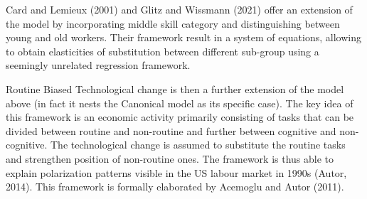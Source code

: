\documentclass{article}
\begin{document}
Card and Lemieux (2001) and Glitz and Wissmann (2021) offer an extension of the model by incorporating middle skill category and distinguishing between young and old workers. Their framework result in a system of equations, allowing to obtain elasticities of substitution between different sub-group using a seemingly unrelated regression framework.

Routine Biased Technological change is then a further extension of the model above (in fact it nests the Canonical model as its specific case). The key idea of this framework is an economic activity primarily consisting of tasks that can be divided between routine and non-routine and further between cognitive and non-cognitive. The technological change is assumed to substitute the routine tasks and strengthen position of non-routine ones. The framework is thus able to explain polarization patterns visible in the US labour market in 1990s (Autor, 2014). This framework is formally elaborated by Acemoglu and Autor (2011).
\end{document}
